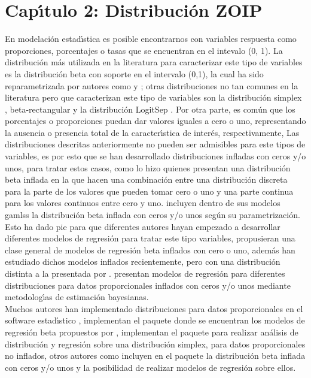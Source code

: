 \chapter{Cap\'{\i}tulo 2: Distribuci\'{o}n ZOIP} \label{cap2}

En modelaci\'{o}n estad\'{\i}stica es posible encontrarnos con variables respuesta como proporciones, porcentajes o tasas que se encuentran en el intevalo (0, 1). La distribuci\'{o}n m\'{a}s utilizada en la literatura para caracterizar este tipo de variables es la distribuci\'{o}n beta con soporte en el intervalo (0,1), la cual ha sido reparametrizada por autores como \cite{Ferrari2} y \cite{Stasinopoulos2}; otras distribuciones no tan comunes en la literatura pero que caracterizan este tipo de variables son la distribuci\'{o}n simplex \citep{Jorgensen1}, beta-rectangular \citep{Hahn1} y la distribuci\'{o}n LogitSep \citep{Hossain1}. Por otra parte, es com\'{u}n que los porcentajes o proporciones puedan dar valores iguales a cero o uno, representando la ausencia o presencia total de la caracter\'{\i}stica de inter\'{e}s, respectivamente, Las distribuciones descritas anteriormente no pueden ser admisibles para este tipos de variables, es por esto que se han desarrollado distribuciones infladas con ceros y/o unos, para tratar estos casos, como lo hizo \cite{Ospina2} quienes presentan una distribuci\'{o}n beta inflada en la que hacen una combinaci\'{o}n entre una distribuci\'{o}n discreta para la parte de los valores que pueden tomar cero o uno y una parte continua para los valores continuos entre cero y uno. \cite{Stasinopoulos2} incluyen dentro de sus modelos gamlss la distribuci\'{o}n beta inflada con ceros y/o unos seg\'{u}n su parametrizaci\'{o}n.\\

Esto ha dado pie para que diferentes autores hayan empezado a desarrollar diferentes modelos de regresi\'{o}n para tratar este tipo variables, \cite{Ospina1} propusieran una clase general de modelos de regresi\'{o}n beta inflados con cero o uno, adem\'{a}s \cite{Kosmidis1} han estudiado dichos modelos inflados recientemente, pero con una distribuci\'{o}n distinta a la presentada por \cite{Ospina1}. \cite{Galvis1} presentan modelos de regresi\'{o}n para diferentes distribuciones para datos proporcionales inflados con ceros y/o unos mediante metodolog\'{\i}as de estimaci\'{o}n bayesianas.\\

Muchos autores han implementado distribuciones para datos proporcionales en el software estad\'{\i}stico , \cite{Zeileis1} implementan el paquete  donde se encuentran los modelos de regresi\'{o}n beta propuestos por \cite{Ferrari2}, \cite{Qiu1} implementan el paquete  para realizar an\'{a}lisis de distribuci\'{o}n y regresi\'{o}n sobre una distribuci\'{o}n simplex, para datos proporcionales no inflados, otros autores como \citep{Stasinopoulos1} incluyen en el paquete  la distribuci\'{o}n beta inflada con ceros y/o unos y la posibilidad de realizar modelos de regresi\'{o}n sobre ellos.\\

